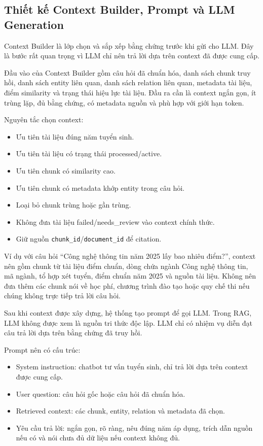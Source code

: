 \subsection{Thiết kế Context Builder, Prompt và LLM Generation}

Context Builder là lớp chọn và sắp xếp bằng chứng trước khi gửi cho LLM. Đây là bước rất quan trọng vì LLM chỉ nên trả lời dựa trên context đã được cung cấp.

Đầu vào của Context Builder gồm câu hỏi đã chuẩn hóa, danh sách chunk truy hồi, danh sách entity liên quan, danh sách relation liên quan, metadata tài liệu, điểm similarity và trạng thái hiệu lực tài liệu. Đầu ra cần là context ngắn gọn, ít trùng lặp, đủ bằng chứng, có metadata nguồn và phù hợp với giới hạn token.

Nguyên tắc chọn context:

\begin{itemize}
    \item Ưu tiên tài liệu đúng năm tuyển sinh.
    \item Ưu tiên tài liệu có trạng thái processed/active.
    \item Ưu tiên chunk có similarity cao.
    \item Ưu tiên chunk có metadata khớp entity trong câu hỏi.
    \item Loại bỏ chunk trùng hoặc gần trùng.
    \item Không đưa tài liệu failed/needs\_review vào context chính thức.
    \item Giữ nguồn \texttt{chunk\_id}/\texttt{document\_id} để citation.
\end{itemize}

Ví dụ với câu hỏi ``Công nghệ thông tin năm 2025 lấy bao nhiêu điểm?'', context nên gồm chunk từ tài liệu điểm chuẩn, dòng chứa ngành Công nghệ thông tin, mã ngành, tổ hợp xét tuyển, điểm chuẩn năm 2025 và nguồn tài liệu. Không nên đưa thêm các chunk nói về học phí, chương trình đào tạo hoặc quy chế thi nếu chúng không trực tiếp trả lời câu hỏi.

Sau khi context được xây dựng, hệ thống tạo prompt để gọi LLM. Trong RAG, LLM không được xem là nguồn tri thức độc lập. LLM chỉ có nhiệm vụ diễn đạt câu trả lời dựa trên bằng chứng đã truy hồi.

Prompt nên có cấu trúc:

\begin{itemize}
    \item System instruction: chatbot tư vấn tuyển sinh, chỉ trả lời dựa trên context được cung cấp.
    \item User question: câu hỏi gốc hoặc câu hỏi đã chuẩn hóa.
    \item Retrieved context: các chunk, entity, relation và metadata đã chọn.
    \item Yêu cầu trả lời: ngắn gọn, rõ ràng, nêu đúng năm áp dụng, trích dẫn nguồn nếu có và nói chưa đủ dữ liệu nếu context không đủ.
\end{itemize}


